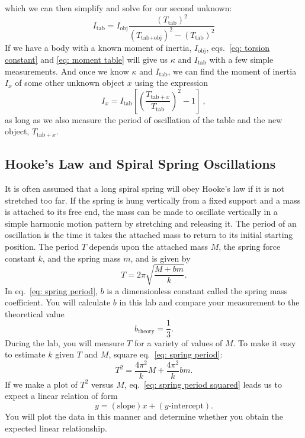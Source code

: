 \documentclass[addpoints]{physlabs}
\begin{document}
\begin{labsection}
\begin{equation}
\end{equation}
%
which we can then simplify and solve for our second unknown:
%
\begin{equation}\label{eq: moment table}
    \boxed{I_\text{tab} = I_\text{obj} \frac{(T_{\text{tab}})^2}{(T_{\text{tab}+\text{obj}})^2 - (T_{\text{tab}})^2}}
\end{equation}
%
If we have a body with a known moment of inertia, $I_\text{obj}$, eqs.~\ref{eq: torsion constant} and \ref{eq: moment table} will give us $\kappa$ and $I_\text{tab}$ with a few simple measurements. And once we know $\kappa$ and $I_\text{tab}$, we can find the moment of inertia $I_x$ of some other unknown object $x$ using the expression
%
\begin{equation}\label{eq: moment unknown}
    \boxed{I_x = I_\text{tab}\left[\left(\frac{T_{\text{tab}+x}}{T_\text{tab}}\right)^2 - 1\right]}\ ,
\end{equation}
%
as long as we also measure the period of oscillation of the table and the new object, $T_{\text{tab}+x}$.

\subsection*{Hooke's Law and Spiral Spring Oscillations}

It is often assumed that a long spiral spring will obey Hooke's law if it is not stretched too far. If the spring is hung vertically from a fixed support and a mass is attached to its free end, the mass can be made to oscillate vertically in a simple harmonic motion pattern by stretching and releasing it. The period of an oscillation is the time it takes the attached mass to return to its initial starting position. The period $T$ depends upon the attached mass $M$, the spring force constant $k$, and the spring mass $m$, and is given by
%
\begin{equation}\label{eq: spring period}
    T = 2\pi\sqrt{\frac{M + bm}{k}}.
\end{equation}
%
In eq.~\ref{eq: spring period}, $b$ is a dimensionless constant called the spring mass coefficient. You will calculate $b$ in this lab and compare your measurement to the theoretical value
%
\begin{equation}\label{eq: spring coefficient theoretical}
    b_\text{theory} = \frac{1}{3}.
\end{equation}
%
During the lab, you will measure $T$ for a variety of values of $M$. To make it easy to estimate $k$ given $T$ and $M$, square eq.~\ref{eq: spring period}:
%
\begin{equation}\label{eq: spring period squared}
    T^2 = \frac{4\pi^2}{k}M + \frac{4\pi^2}{k}bm.
\end{equation}
%
If we make a plot of $T^2$ versus $M$, eq.~\ref{eq: spring period squared} leads us to expect a linear relation of form
%
\begin{equation}\label{eq: spring period linear}
    y = (\text{slope})x + (\text{$y$-intercept}).
\end{equation}
%
You will plot the data in this manner and determine whether you obtain the expected linear relationship.


\end{labsection}
\end{document}
